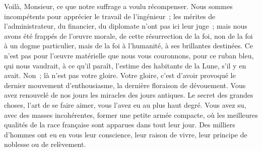 \documentclass[french,twoside]{book} %
\begin{document}
Voilà, Monsieur, ce que notre suffrage a voulu récompenser. Nous sommes incompétents pour apprécier le travail de l’ingénieur ; les mérites de l’administrateur, du financier, du diplomate n’ont pas ici leur juge ; mais nous avons été frappés de l’œuvre morale, de cette résurrection de la foi, non de la foi à un dogme particulier, mais de la foi à l’humanité, à ses brillantes destinées. Ce n’est pas pour l’œuvre matérielle que nous vous couronnons, pour ce ruban bleu, qui nous vaudrait, à ce qu’il paraît, l’estime des habitants de la Lune, s’il y en avait. Non ; là n’est pas votre gloire. Votre gloire, c’est d’avoir provoqué le dernier mouvement d’enthousiasme, la dernière floraison de dévouement. Vous avez renouvelé de nos jours les miracles des jours antiques. Le secret des grandes choses, l’art de se faire aimer, vous l’avez eu au plus haut degré. Vous avez su, avec des masses incohérentes, former une petite armée compacte, où les meilleures qualités de la race française sont apparues dans tout leur jour. Des milliers d’hommes ont eu en vous leur conscience, leur raison de vivre, leur principe de noblesse ou de relèvement.\par
\end{document}
